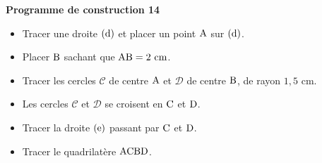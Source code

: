 \documentclass[exercice,a4]{thedocument}%
\begin{document}
%
\noindent\textbf{Programme de construction 14}\par\smallskip\noindent
\begin{itemize}
    \item Tracer une droite $(\text{d})$ et placer un point
    $\text{A}$ sur $(\text{d})$.
    \item Placer $\text{B}$ sachant que $\text{AB}=2\text{ cm}$.
    \item Tracer les cercles $\mathcal{C}$ de centre $\text{A}$ et
    $\mathcal{D}$ de centre $\text{B}$, de rayon $1{,}5\text{ cm}$.
    \item Les cercles $\mathcal{C}$ et $\mathcal{D}$ se croisent en
    $\text{C}$ et $\text{D}$.
    \item Tracer la droite $(\text{e})$ passant par
    $\text{C}$ et $\text{D}$.
    \item Tracer le quadrilatère $\text{ACBD}$.
\end{itemize}
\end{document}
